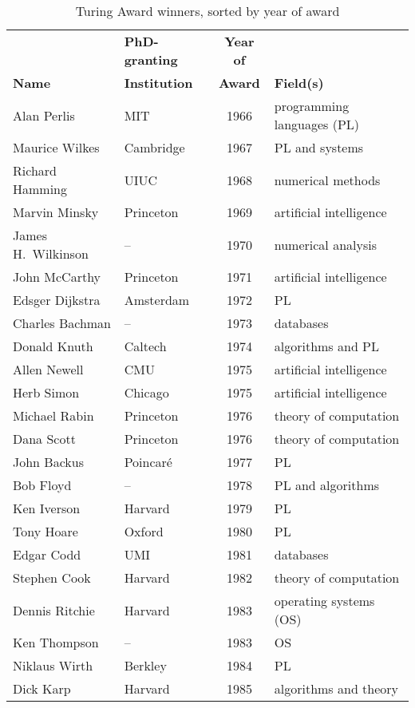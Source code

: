 \documentclass[doublespacing]{utdthesis}
\begin{document}
\begin{table}[p]
  \caption{Turing Award winners, sorted by year of award}
  \label{t:splittable}
  \begin{center}
  \begin{tabular}{llcp{2.5in}} \hline
  & \textbf{PhD-granting} & \textbf{Year of} & \\
  \textbf{Name} & \textbf{Institution} & \textbf{Award} & \textbf{Field(s)} \\ \hline
  Alan Perlis & MIT & 1966 & programming languages (PL) \\
  Maurice Wilkes & Cambridge & 1967 & PL and systems \\
  Richard Hamming & UIUC & 1968 & numerical methods \\
  Marvin Minsky & Princeton & 1969 & artificial intelligence \\
  James H.~Wilkinson & -- & 1970 & numerical analysis \\
  John McCarthy & Princeton & 1971 & artificial intelligence \\
  Edsger Dijkstra & Amsterdam & 1972 & PL \\
  Charles Bachman & -- & 1973 & databases \\
  Donald Knuth & Caltech & 1974 & algorithms and PL \\
  Allen Newell & CMU & 1975 & artificial intelligence \\
  Herb Simon & Chicago & 1975 & artificial intelligence \\
  Michael Rabin & Princeton & 1976 & theory of computation \\
  Dana Scott & Princeton & 1976 & theory of computation \\
  John Backus & Poincar\'e & 1977 & PL \\
  Bob Floyd & -- & 1978 & PL and algorithms \\
  Ken Iverson & Harvard & 1979 & PL \\
  Tony Hoare & Oxford & 1980 & PL \\
  Edgar Codd & UMI & 1981 & databases \\
  Stephen Cook & Harvard & 1982 & theory of computation \\
  Dennis Ritchie & Harvard & 1983 & operating systems (OS) \\
  Ken Thompson & -- & 1983 & OS \\
  Niklaus Wirth & Berkley & 1984 & PL \\
  Dick Karp & Harvard & 1985 & algorithms and theory \\

\end{tabular}
\end{center}
\end{table}
\end{document}
